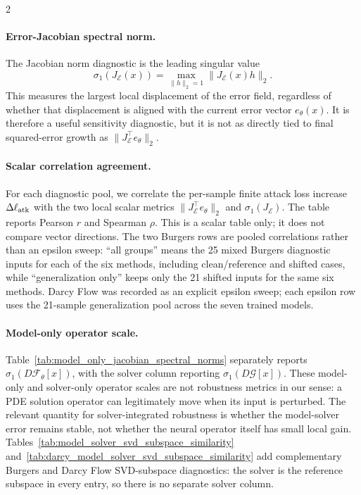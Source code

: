 \documentclass[letterpaper]{article} %
\newcommand{\tabref}[1]{Table~\ref{#1}}
\begin{document}
\begin{multicols}{2}
\paragraph{Error-Jacobian spectral norm.}
The Jacobian norm diagnostic is the leading singular value
\[
  \sigma_1(J_{\mathcal E}(x))
  =
  \max_{\|h\|_2=1}\|J_{\mathcal E}(x)h\|_2 .
\]
This measures the largest local displacement of the error field, regardless of
whether that displacement is aligned with the current error vector
\(e_\theta(x)\).  It is therefore a useful sensitivity diagnostic, but it is not
as directly tied to final squared-error growth as
\(\|J_{\mathcal E}^{\top}e_\theta\|_2\).

\paragraph{Scalar correlation agreement.}
For each diagnostic pool, we correlate the per-sample finite attack loss
increase \(\Delta\ell_{\rm atk}\) with the two local scalar metrics
\(\|J_{\mathcal E}^{\top}e_\theta\|_2\) and
\(\sigma_1(J_{\mathcal E})\).  The table reports Pearson \(r\) and Spearman
\(\rho\).  This is a scalar table only; it does not compare vector directions.
The two Burgers rows are pooled correlations rather than an epsilon sweep:
``all groups'' means the 25 mixed Burgers diagnostic inputs for each of the six
methods, including clean/reference and shifted cases, while ``generalization
only'' keeps only the 21 shifted inputs for the same six methods.  Darcy Flow
was recorded as an explicit epsilon sweep; each epsilon row uses the 21-sample
generalization pool across the seven trained models.

\paragraph{Model-only operator scale.}
\tabref{tab:model_only_jacobian_spectral_norms} separately reports
\(\sigma_1(D\mathcal{F}_\theta[x])\), with the solver column reporting
\(\sigma_1(D\mathcal{G}[x])\).  These model-only and solver-only operator
scales are not robustness metrics in our sense: a PDE solution operator can
legitimately move when its input is perturbed.  The relevant quantity for
solver-integrated robustness is whether the model-solver error remains stable,
not whether the neural operator itself has small local gain.
Tables~\ref{tab:model_solver_svd_subspace_similarity}
and~\ref{tab:darcy_model_solver_svd_subspace_similarity} add complementary
Burgers and Darcy Flow SVD-subspace diagnostics: the solver is the reference
subspace in every entry, so there is no separate solver column.

\end{multicols}
\end{document}
